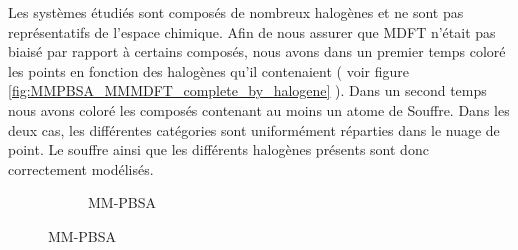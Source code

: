 Les systèmes étudiés sont composés de nombreux halogènes et ne sont pas représentatifs de l'espace chimique. Afin de nous assurer que MDFT n'était pas biaisé par rapport à certains composés, nous avons dans un premier temps coloré les points en fonction des halogènes qu'il contenaient ( voir figure \ref{fig:MMPBSA_MMMDFT_complete_by_halogene} ). Dans un second temps nous avons coloré les composés contenant au moins un atome de Souffre. Dans les deux cas, les différentes catégories sont uniformément réparties dans le nuage de point. Le souffre ainsi que les différents halogènes présents sont donc correctement modélisés.



\clearpage
\begin{figure}[H]
    \begin{subfigure}[b]{0.50\textwidth}
        \centering
        \caption{MM-PBSA}
\end{subfigure}
\end{figure}
